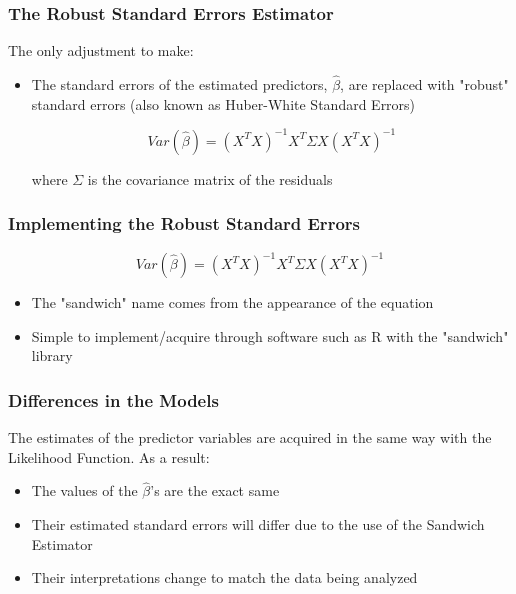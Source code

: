 \documentclass{beamer}
\begin{document}
\begin{frame}[fragile]\frametitle{The Robust Standard Errors Estimator}
	
	The only adjustment to make:	
	
	\begin{itemize}
		
		\item The standard errors of the estimated predictors, $\hat{\beta}$, are replaced with "robust" standard errors (also known as Huber-White Standard Errors) 
		
		$$ Var(\hat{\beta}) = (X^{T}X)^{-1}X^{T} \Sigma X(X^{T}X)^{-1} $$
		
		where $\Sigma$ is the covariance matrix of the residuals			
		
	\end{itemize}	
	
\end{frame}



\begin{frame}[fragile]\frametitle{Implementing the Robust Standard Errors}
	
	$$ Var(\hat{\beta}) = (X^{T}X)^{-1}X^{T} \Sigma X(X^{T}X)^{-1} $$
		
	\begin{itemize}
	
		\item The "sandwich" name comes from the appearance of the equation
		
		\item Simple to implement/acquire through software such as R with the "sandwich" library
		
	\end{itemize}
	
\end{frame}



\begin{frame}[fragile]\frametitle{Differences in the Models}

	The estimates of the predictor variables are acquired in the same way with the Likelihood Function. As a result:	
	\begin{itemize}

		\item The values of the $\hat{\beta}$'s are the exact same
		
		\item Their estimated standard errors will differ due to the use of the Sandwich Estimator
		
		\item Their interpretations change to match the data being analyzed

	\end{itemize}
	
\end{frame}
\end{document}
